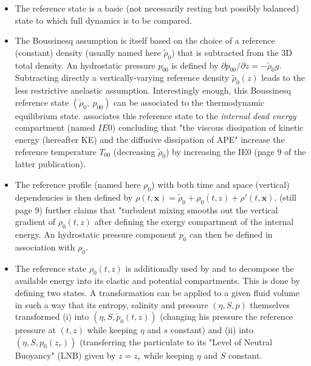 \begin{itemize}
\setlength\itemsep{0pt}
	\item The reference state is a basic (not necessarily resting but possibly balanced) state to which full dynamics is to be compared.
	\item The Boussinesq assumption is itself based on the choice of a reference (constant) density (usually named here $\tilde{\rho}_{0}$) that is subtracted from the 3D total density. An hydrostatic pressure $p_{00}$ is defined by $\partial p_{00}/ \partial z=-\tilde{\rho}_{0} g$. Subtracting directly a vertically-varying reference density $\tilde{\rho}_{0}(z)$ leads to the less restrictive anelastic assumption. Interestingly enough, this Boussinesq reference state $(\tilde{\rho}_{0},\ p_{00})$ can be associated to the thermodynamic equilibrium state. \cite{tailleux_energetics_2009,tailleux_thermodynamicsdynamics_2012} associates this reference state to the \textit{internal dead energy} compartment (named $IE0$) concluding that "the viscous dissipation of kinetic energy (hereafter KE) and the diffusive dissipation of APE" increase the reference temperature $T_{00}$ (decreasing $\tilde{\rho}_{0}$) by increasing the IE0 (page 9 of the latter publication).
	\item The reference profile (named here $\rho_0$) with both time and space (vertical) dependencies is then defined by $\rho(t,\mathbf{x})=\tilde{\rho}_{0}+\rho_0(t,z)+\rho'(t,\mathbf{x})$.  \cite{tailleux_thermodynamicsdynamics_2012} (still page 9) further claims that "turbulent mixing smooths out the vertical gradient of $\rho_0(t,z)$ after defining the exergy compartment of the internal energy. An hydrostatic pressure component $p_0$ can then be defined in association with $\rho_0$.
	\item The reference state $\rho_0(t,z)$ is additionally used by \citep{andrews_note_1981} and \citep{tailleux_local_2018} to decompose the available energy into its elastic and potential compartments. This is done by defining two states. A transformation can be applied to a given fluid volume in such a way that its entropy, salinity and pressure $(\eta,S,p)$ themselves transformed (i) into $(\eta,S,\tilde{p}_0(t,z))$ (changing his pressure the reference pressure at $(t,z)$ while keeping $\eta$ and $s$ constant) and (ii) into $(\eta,S,p_0(z_r))$ (transferring the particulate to its "Level of Neutral Buoyancy" (LNB) given by $z=z_r$ while keeping $\eta$ and $S$ constant. \\
\end{itemize}


